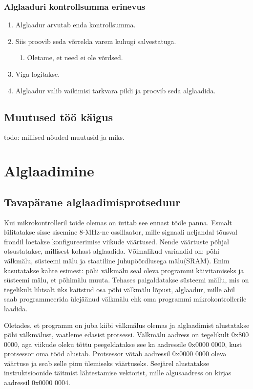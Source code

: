 \documentclass[12pt,a4paper]{article}
\begin{document}
\subsubsection{Alglaaduri kontrollsumma erinevus}
\begin{enumerate}
	\item Alglaadur arvutab enda kontrollsumma.
	\item Siis proovib seda võrrelda varem kuhugi salvestatuga.
		\begin{enumerate}
		\item Oletame, et need ei ole võrdsed.
		\end{enumerate}
	\item Viga logitakse.
	\item Alglaadur valib vaikimisi tarkvara pildi ja proovib seda alglaadida.
\end{enumerate}

\subsection{Muutused töö käigus}
todo: millised nõuded muutusid ja miks.

\section{Alglaadimine}
\label{sec:boot}
\subsection{Tavapärane alglaadimisprotseduur}
\label{sec:boot:tava}
Kui mikrokontrolleril toide olemas on üritab see ennast tööle panna.
Esmalt lülitatakse sisse sisemine 8-MHz-ne ossillaator, mille signaali
neljandal tõusval frondil loetakse konfigureerimise viikude väärtused. Nende
väärtuste põhjal otsustatakse, millisest kohast alglaadida. Võimalikud
variandid on: põhi välkmälu, süsteemi mälu ja staatiline juhupöördlusega
mälu(SRAM).  Enim kasutatakse kahte esimest: põhi välkmälu seal oleva programmi
käivitamiseks ja süsteemi mälu, et põhimälu muuta. Tehases paigaldatakse
süsteemi mällu, mis on tegelikult lihtsalt üks kaitstud osa põhi välkmälu
lõpust, alglaadur, mille abil saab programmeerida ülejäänud välkmälu ehk oma
programmi mikrokontrollerile laadida.

Oletades, et programm on juba kiibi välkmälus olemas ja alglaadimist
alustatakse põhi välkmälust, vaatleme edasist protsessi. Välkmälu aadress on
tegelikult 0x800 0000, aga viikude oleku tõttu peegeldatakse see ka aadressile
0x0000 0000, kust protsessor oma tööd alustab.  Protsessor võtab aadressil
0x0000 0000 oleva väärtuse ja seab selle pinu ülemiseks väärtuseks. Seejärel
alustatakse instruktsioonide täitmist lähtestamise vektorist, mille
algusaadress on kirjas aadressil 0x0000 0004. \cite{f1rm}
\end{document}
